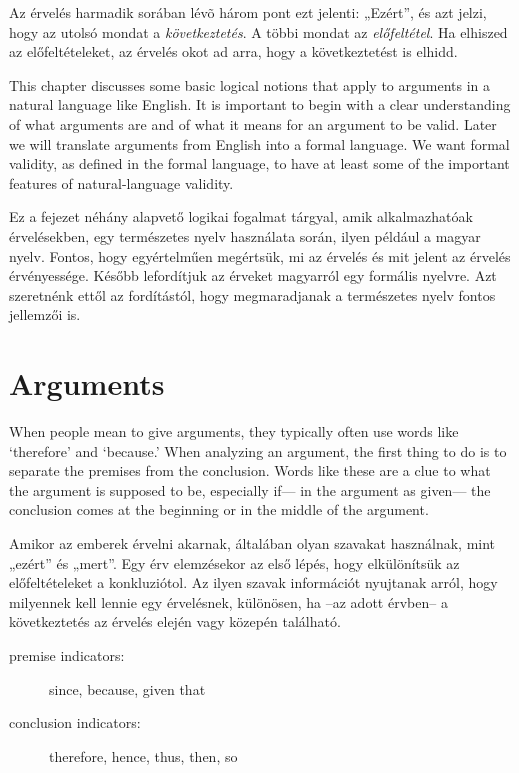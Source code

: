 Az érvelés harmadik sorában lévõ három pont ezt jelenti: „Ezért”, és azt jelzi, hogy az utolsó mondat a \emph{következtetés}. A többi mondat az \emph{előfeltétel}. Ha elhiszed az előfeltételeket, az érvelés okot ad arra, hogy a következtetést is elhidd.

This chapter discusses some basic logical notions that apply to arguments in a natural language like English. It is important to begin with a clear understanding of what arguments are and of what it means for an argument to be valid. Later we will translate arguments from English into a formal language. We want formal validity, as defined in the formal language, to have at least some of the important features of natural-language validity.

Ez a fejezet néhány alapvető logikai fogalmat tárgyal, amik alkalmazhatóak érvelésekben, egy természetes nyelv használata során, ilyen például a magyar nyelv. Fontos, hogy egyértelműen megértsük, mi az érvelés és mit jelent az érvelés érvényessége. Később lefordítjuk az érveket magyarról  egy formális nyelvre. Azt szeretnénk ettől az fordítástól, hogy megmaradjanak a természetes nyelv fontos jellemzői is.

\section{Arguments}
When people mean to give arguments, they typically often use words like `therefore' and `because.' When analyzing an argument, the first thing to do is to separate the premises from the conclusion. Words like these are a clue to what the argument is supposed to be, especially if--- in the argument as given--- the conclusion comes at the beginning or in the middle of the argument.

Amikor az emberek érvelni akarnak, általában olyan szavakat használnak, mint „ezért” és „mert”. Egy érv elemzésekor az első lépés, hogy elkülönítsük az előfeltételeket a konkluziótol. Az ilyen szavak információt nyujtanak arról, hogy milyennek kell lennie egy érvelésnek, különösen, ha --az adott érvben-- a következtetés az érvelés elején vagy közepén található.


\begin{description}
\item[premise indicators:] since, because, given that
\item[conclusion indicators:] therefore, hence, thus, then, so
\end{description}



